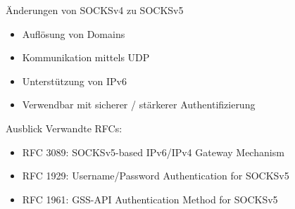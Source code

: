 \documentclass[t]{beamer}
\begin{document}
  \begin{frame}{Änderungen von SOCKSv4 zu SOCKSv5}
	 \begin{itemize}
		\item
		Auflösung von Domains
		\item
		Kommunikation mittels UDP
		\item
		Unterstützung von IPv6
		\item
		Verwendbar mit sicherer / stärkerer Authentifizierung
  	\end{itemize}
  \end{frame}

  \begin{frame}{Ausblick}
    Verwandte RFCs:

    \begin{itemize}
      \item RFC 3089: SOCKSv5-based IPv6/IPv4 Gateway Mechanism
      \item RFC 1929: Username/Password Authentication for SOCKSv5
      \item RFC 1961: GSS-API Authentication Method for SOCKSv5
    \end{itemize}
  \end{frame}
\end{document}

